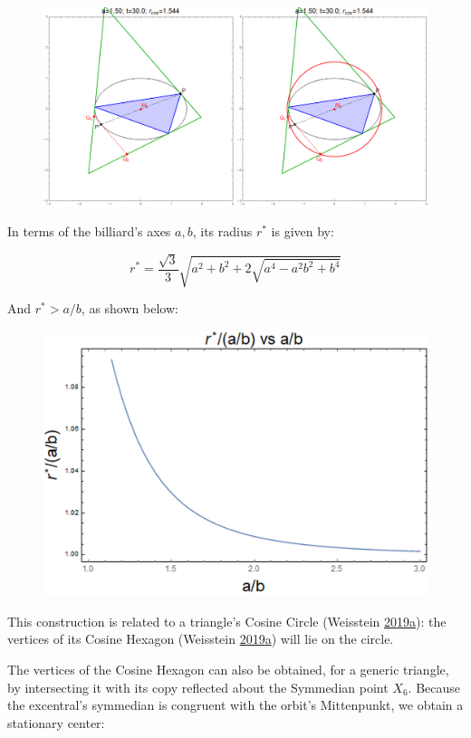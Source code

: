 \documentclass[]{article}
\begin{document}
\begin{figure}[H]

{\centering \includegraphics[width=0.75\linewidth]{pics/cosine_circle_construction_and_locus} 

}

\end{figure}

In terms of the billiard's axes \(a,b\), its radius \(r^*\) is given by:

\[
r^* = \frac{\sqrt{3}}{3}\sqrt{a^2+b^2+ 2\sqrt{a^4-a^2 b^2+b^4}}
\]

And \(r^*>a/b\), as shown below:

\begin{figure}[H]

{\centering \includegraphics[width=0.5\linewidth]{pics/cosine_circle_ratios2} 

}

\end{figure}

This construction is related to a triangle's Cosine Circle (Weisstein \protect\hyperlink{ref-mw}{2019}\protect\hyperlink{ref-mw}{a}): the vertices of its Cosine Hexagon (Weisstein \protect\hyperlink{ref-mw}{2019}\protect\hyperlink{ref-mw}{a}) will lie on the circle.

The vertices of the Cosine Hexagon can also be obtained, for a generic triangle, by intersecting it with its copy reflected about the Symmedian point \(X_6\). Because the excentral's symmedian is congruent with the orbit's Mittenpunkt, we obtain a stationary center:
\end{document}
